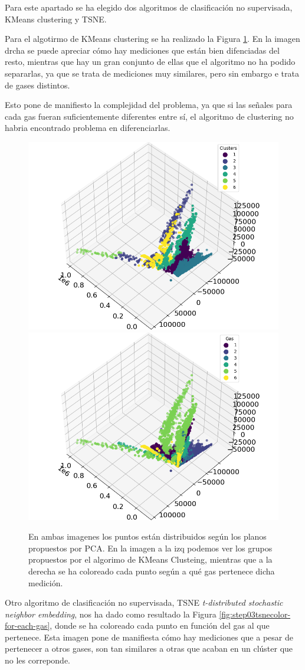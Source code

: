 Para este apartado se ha elegido dos algoritmos de clasificación no supervisada, KMeans clustering y TSNE. 

Para el algotirmo de KMeans clustering se ha realizado la Figura \ref{fig:step03color-for-each-cluster}. En la imagen drcha se puede apreciar cómo hay mediciones que están bien difenciadas del resto, mientras que hay un gran conjunto de ellas que el algoritmo no ha podido separarlas, ya que se trata de mediciones muy similares, pero sin embargo e trata de gases distintos. 
	
Esto pone de manifiesto la complejidad del problema, ya que si las señales para cada gas fueran suficientemente diferentes entre sí, el algoritmo de clustering no habria encontrado problema en diferenciarlas. 

\begin{figure}[h!]
	\centering
	\includegraphics[width=0.45\linewidth]{"../py_imgs/Step0_3_Color for each cluster_3d_All data"}
	\includegraphics[width=0.45\linewidth]{"../py_imgs/Step0_3_Color for each gas_3d_All data"}
	\caption[Resultados KMeans Clustering]{En ambas imagenes los puntos están distribuidos según los planos propuestos por PCA. En la imagen a la izq podemos ver los grupos propuestos por el algorimo de KMeans Clusteing, mientras que a la derecha se ha coloreado cada punto según a qué gas pertenece dicha medición. }
	\label{fig:step03color-for-each-cluster}
\end{figure}


Otro algoritmo de clasificación no supervisada, TSNE \emph{t-distributed stochastic neighbor embedding}, nos ha dado como resultado la Figura \ref{fig:step03tsnecolor-for-each-gas}, donde se ha coloreado cada punto en función del gas al que pertenece. Esta imagen pone de manifiesta cómo hay mediciones que a pesar de pertenecer a otros gases, son tan similares a otras que acaban en un clúster que no les correponde. 


